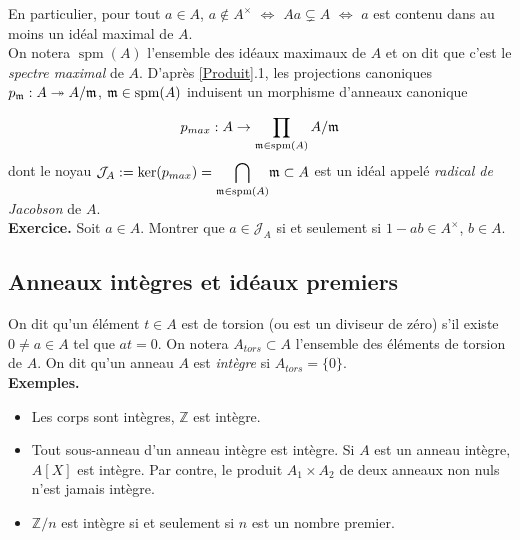 \documentclass[a4paper, oneside, 12pt]{book}
\theoremstyle{theoremeStyle} %
\theoremstyle{definition} %
\DeclareMathOperator{\spm}{spm}
\newcommand{\Z}{\mathbb{Z}}
\begin{document}
 En particulier, pour tout $a\in A$, $a\notin A^\times$ $\Leftrightarrow$ $Aa\subsetneq A$  $\Leftrightarrow$ $a$ est contenu dans au moins un  idéal maximal de $A$.\\




 On notera $\spm(A)$ l'ensemble des idéaux maximaux de $A$ et on dit que c'est le \textit{spectre maximal} de $A$. D'après \ref{Produit}.1, les projections canoniques $p_{\frak{m}}:A\twoheadrightarrow A/\frak{m}$, $\frak{m}\in \spm(A)$ induisent un morphisme d'anneaux canonique

$$p_{max}:A\rightarrow \prod_{\frak{m}\in \spm(A)}A/\frak{m}$$
dont le noyau  $\mathcal{J}_A:=\ker(p_{max})=\displaystyle{\bigcap_{\frak{m}\in \spm(A)}}\frak{m}\subset A$ est un idéal  appelé \textit{radical de Jacobson} de $A$.\\

\textbf{Exercice.} Soit $a\in A$. Montrer que $a\in \mathcal{J}_A$ si et seulement si $1-ab\in A^\times$, $b\in A$. \\






  \subsection{Anneaux intègres et idéaux premiers}\label{Integre} On dit qu'un élément $t\in A$ est de torsion (ou est un diviseur de zéro) s'il existe $0\not= a\in A$ tel que $at=0$. On notera $A_{tors}\subset A$ l'ensemble des éléments de torsion de $A$. On dit qu'un anneau $A$ est \textit{intègre} si $A_{tors}=\lbrace 0\rbrace $.\\

 \textbf{Exemples.}
   \begin{itemize}[leftmargin=* ,parsep=0cm,itemsep=0cm,topsep=0cm]
     \item Les corps  sont intègres, $\Z$ est intègre.
     \item Tout sous-anneau d'un anneau intègre est intègre. Si $A$ est un anneau intègre, $A[X]$ est intègre. Par contre, le produit $A_1\times A_2$ de deux anneaux non nuls n'est jamais intègre.
     \item $\Z/n$ est intègre si et seulement si $n$ est un nombre premier. \\
\end{itemize}
\end{document}
